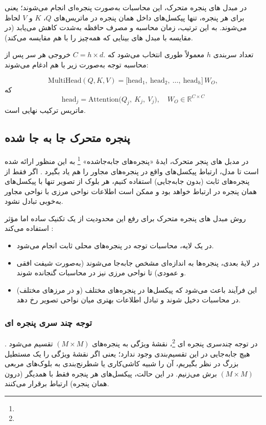 در مبدل های پنجره متحرک، این محاسبات به‌صورت پنجره‌ای انجام می‌شوند؛ یعنی 
برای هر پنجره، تنها پیکسل‌های داخل همان پنجره در ماتریس‌های 
\(\displaystyle Q\)، \(\displaystyle K\) و \(\displaystyle V\) لحاظ می‌شوند. 
به این ترتیب، زمان محاسبه و مصرف حافظه به‌شدت کاهش می‌یابد 
(در مقایسه با مبدل های بینایی که همه‌چیز را با هم مقایسه می‌کند).

تعداد سربندی \(\displaystyle h\) معمولاً طوری انتخاب می‌شود که 
\(\displaystyle C = h \times d.\) 
خروجی هر سر پس از محاسبه توجه به‌صورت زیر با هم ادغام می‌شوند:

\[
\mathrm{MultiHead}(Q,K,V) 
= 
\bigl[\text{head}_1,\ \text{head}_2,\ \dots,\ \text{head}_h\bigr]\,
W_O,
\]
که 
\[
\text{head}_j = \mathrm{Attention}\bigl(Q_j,\ K_j,\ V_j\bigr),
\quad 
W_O \in \mathbb{R}^{C \times C}
\]
ماتریس ترکیب نهایی است.

\subsection{پنجره متحرک جا به جا شده}

در مدبل های پنجر متحرک، ایدهٔ «پنجره‌های جابه‌جاشده»    \footnote{}
به این منظور ارائه شده است تا مدل، ارتباط پیکسل‌های واقع در پنجره‌های مجاور را هم یاد بگیرد \cite{liu2021swintransformer}.
اگر فقط از پنجره‌های ثابت (بدون جابه‌جایی) استفاده کنیم، هر بلوک از تصویر تنها با پیکسل‌های همان 
پنجره در ارتباط خواهد بود و ممکن است اطلاعات نواحی مرزی با نواحی مجاور به‌خوبی تبادل نشود.

روش مبدل های پنجره متحرک برای رفع این محدودیت از یک تکنیک ساده اما مؤثر استفاده می‌کند \cite{liu2021swintransformer}:
\begin{itemize}
	\item در یک لایه، محاسبات توجه در پنجره‌های محلی ثابت انجام می‌شود.
	\item در لایهٔ بعدی، پنجره‌ها به اندازه‌ای مشخص جابه‌جا می‌شوند (به‌صورت شیفت افقی و عمودی) 
	تا نواحی مرزی نیز در محاسبات گنجانده شوند.
	\item این فرآیند باعث می‌شود که پیکسل‌ها در پنجره‌های مختلف (و در مرزهای مختلف) 
	در محاسبات دخیل شوند و تبادل اطلاعات بهتری میان نواحی تصویر رخ دهد.
\end{itemize}

\subsubsection{توجه چند سری پنجره ای}
در توجه چندسری پنجره ای \footnote{}، نقشهٔ ویژگی به پنجره‌های \(\displaystyle (M \times M)\) تقسیم می‌شود \cite{liu2021swintransformer}.
هیچ جابه‌جایی در این تقسیم‌بندی وجود ندارد؛ یعنی اگر نقشهٔ ویژگی را یک مستطیل بزرگ در نظر بگیریم،
آن را شبیه کاشی‌کاری یا شطرنج‌بندی به بلوک‌های مربعی \(\displaystyle (M \times M)\) برش می‌زنیم.
در این حالت، پیکسل‌های هر پنجره فقط با همدیگر (درون همان پنجره) ارتباط برقرار می‌کنند.

